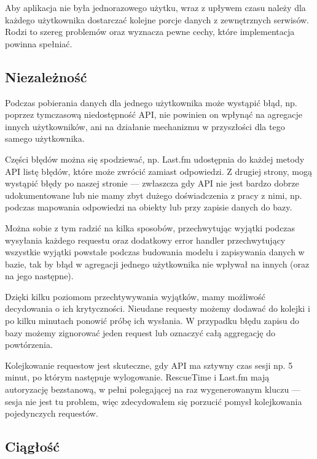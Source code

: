 \documentclass[openright]{xmgr}
\begin{document}
        Aby aplikacja nie była jednorazowego użytku, wraz z upływem czasu należy dla każdego użytkownika dostarczać
        kolejne porcje danych z zewnętrznych serwisów.
        Rodzi to szereg problemów oraz wyznacza pewne cechy, które implementacja powinna spełniać.

        \subsection*{Niezależność}
            Podczas pobierania danych dla jednego użytkownika może wystąpić błąd, np. poprzez tymczasową niedostępność API,
            nie powinien on wpłynąć na agregacje innych użytkowników, ani na działanie mechanizmu w przyszłości dla tego samego użytkownika.

            Części błędów można się spodziewać, np. Last.fm udostępnia do każdej metody API listę błędów, które może zwrócić zamiast odpowiedzi.
            Z drugiej strony, mogą wystąpić błędy po naszej stronie --- zwłaszcza gdy API nie jest bardzo dobrze udokumentowane
            lub nie mamy zbyt dużego doświadczenia z pracy z nimi, np. podczas mapowania odpowiedzi na obiekty lub przy zapisie danych do bazy.

            Można sobie z tym radzić na kilka sposobów, przechwytując wyjątki podczas wysyłania każdego requestu
            oraz dodatkowy error handler przechwytujący wszystkie wyjątki powstałe podczas budowania modelu i zapisywania danych w bazie,
            tak by błąd w agregacji jednego użytkownika nie wpływał na innych (oraz na jego następne).

            Dzięki kilku poziomom przechtywywania wyjątków, mamy możliwość decydowania o ich krytyczności.
            Nieudane requesty możemy dodawać do kolejki i po kilku minutach ponowić próbę ich wysłania.
            W przypadku błędu zapisu do bazy możemy zignorować jeden request lub oznaczyć całą aggregację do powtórzenia.

            Kolejkowanie requestow jest skuteczne, gdy API ma sztywny czas sesji np. 5 minut, po którym następuje wylogowanie.
            RescueTime i Last.fm mają autoryzację bezstanową,
            w pełni polegającej na raz wygenerowanym kluczu --- sesja nie jest tu problem,
            więc zdecydowałem się porzucić pomysł kolejkowania pojedynczych requestów.

        \subsection*{Ciągłość}
\end{document}
